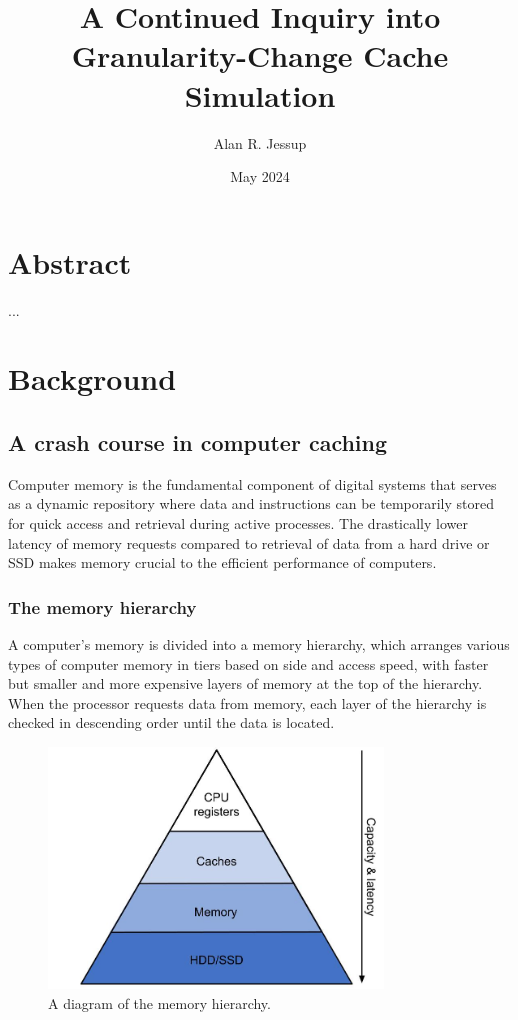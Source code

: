\documentclass[12pt,twoside]{reedthesis}
\title{A Continued Inquiry into Granularity-Change Cache Simulation}
\author{Alan R. Jessup}
\date{May 2024}
\begin{document}
\maketitle
\frontmatter %
\pagestyle{empty}

\tableofcontents

\chapter*{Abstract}

...

\mainmatter
\pagestyle{fancyplain}

\chapter{Background}

\section{A crash course in computer caching}

Computer memory is the fundamental component of digital systems that serves as a dynamic repository where data and instructions can be temporarily stored for quick access and retrieval during active processes. The drastically lower latency of memory requests compared to retrieval of data from a hard drive or SSD makes memory crucial to the efficient performance of computers.

	\subsection*{The memory hierarchy}

	A computer's memory is divided into a memory hierarchy, which arranges various types of computer memory in tiers based on side and access speed, with faster but smaller and more expensive layers of memory at the top of the hierarchy. When the processor requests data from memory, each layer of the hierarchy is checked in descending order until the data is located.

	\begin{figure}[h]
    	\centering
    	\includegraphics[width=3.5in]{figures/mem_hierarchy.jpg}
    	\caption{A diagram of the memory hierarchy.}
	\end{figure}
\end{document}
